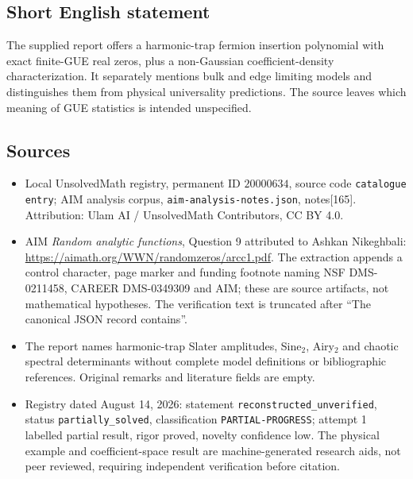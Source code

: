 \documentclass[11pt]{article}
\begin{document}
\subsection{Short English statement}
The supplied report offers a harmonic-trap fermion insertion polynomial with exact finite-GUE real zeros, plus a non-Gaussian coefficient-density characterization. It separately mentions bulk and edge limiting models and distinguishes them from physical universality predictions. The source leaves which meaning of GUE statistics is intended unspecified.
\subsection{Sources}
\begin{itemize}
\item Local UnsolvedMath registry, permanent ID \(20000634\), source code \texttt{catalogue entry}; AIM analysis corpus, \texttt{aim-analysis-notes.json}, notes[165]. Attribution: Ulam AI / UnsolvedMath Contributors, CC BY 4.0.
\item AIM \emph{Random analytic functions}, Question 9 attributed to Ashkan Nikeghbali: \url{https://aimath.org/WWN/randomzeros/arcc1.pdf}. The extraction appends a control character, page marker and funding footnote naming NSF DMS-0211458, CAREER DMS-0349309 and AIM; these are source artifacts, not mathematical hypotheses. The verification text is truncated after ``The canonical JSON record contains''.
\item The report names harmonic-trap Slater amplitudes, Sine\(_2\), Airy\(_2\) and chaotic spectral determinants without complete model definitions or bibliographic references. Original remarks and literature fields are empty.
\item Registry dated August 14, 2026: statement \texttt{reconstructed\_unverified}, status \texttt{partially\_solved}, classification \texttt{PARTIAL-PROGRESS}; attempt 1 labelled partial result, rigor proved, novelty confidence low. The physical example and coefficient-space result are machine-generated research aids, not peer reviewed, requiring independent verification before citation.
\end{itemize}
\end{document}
